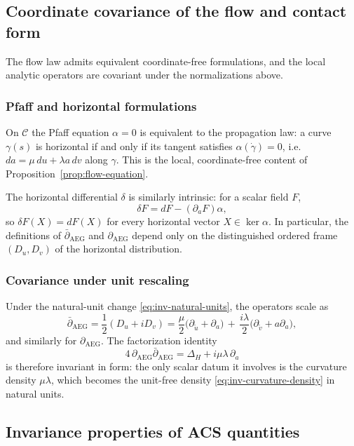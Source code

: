 \subsection{Coordinate covariance of the flow and contact form}\label{subsec:inv-covariance}

The flow law admits equivalent coordinate-free formulations, and the local analytic operators are covariant under the normalizations above.

\subsubsection*{Pfaff and horizontal formulations}
On $\mathcal{C}$ the Pfaff equation $\alpha=0$ is equivalent to the propagation law: a curve $\gamma(s)$ is horizontal if and only if its tangent satisfies $\alpha(\dot\gamma)=0$, i.e.\ $da=\mu\,du+\lambda a\,dv$ along $\gamma$. This is the local, coordinate-free content of Proposition~\ref{prop:flow-equation}.

The horizontal differential $\delta$ is similarly intrinsic: for a scalar field $F$,
\[
\delta F=dF-(\partial_aF)\alpha,
\]
so $\delta F(X)=dF(X)$ for every horizontal vector $X\in\ker\alpha$. In particular, the definitions of $\bar\partial_{\mathrm{AEG}}$ and $\partial_{\mathrm{AEG}}$ depend only on the distinguished ordered frame $(D_u,D_v)$ of the horizontal distribution.

\subsubsection*{Covariance under unit rescaling}
Under the natural-unit change \eqref{eq:inv-natural-units}, the operators scale as
\[
\bar\partial_{\mathrm{AEG}}
=\frac12(D_u+iD_v)
=\frac{\mu}{2}\bigl(\partial_{\tilde u}+\partial_a\bigr)
\,+\,\frac{i\lambda}{2}\bigl(\partial_{\tilde v}+a\partial_a\bigr),
\]
and similarly for $\partial_{\mathrm{AEG}}$. The factorization identity
\[
4\,\partial_{\mathrm{AEG}}\bar\partial_{\mathrm{AEG}}
=\Delta_H+i\mu\lambda\,\partial_a
\]
is therefore invariant in form: the only scalar datum it involves is the curvature density $\mu\lambda$, which becomes the unit-free density \eqref{eq:inv-curvature-density} in natural units.

\subsection{Invariance properties of ACS quantities}\label{subsec:inv-acs}

